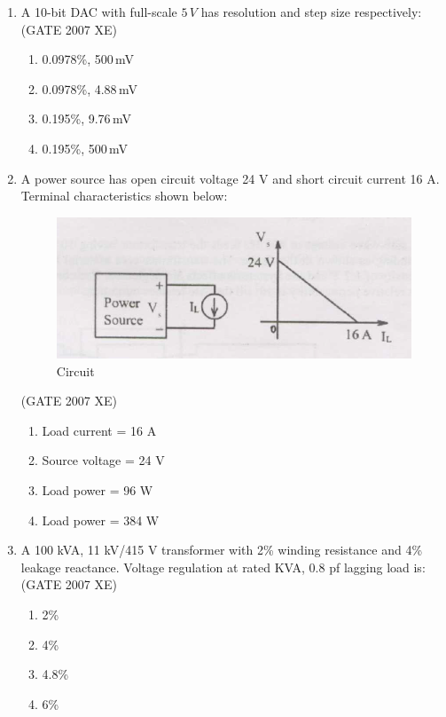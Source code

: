 \documentclass[journal,cmex10]{IEEEtran}
\theoremstyle{remark}
\numberwithin{equation}{enumi}
\numberwithin{figure}{enumi}
\begin{document}
\begin{enumerate}
    \item A 10-bit DAC with full-scale $5\,V$ has resolution and step size respectively:\\
    \hfill{(GATE 2007 XE)}
    \begin{multicols}{2}
    \begin{enumerate}
        \item 0.0978\%, 500\,mV
        \item 0.0978\%, 4.88\,mV
        \item 0.195\%, 9.76\,mV
        \item 0.195\%, 500\,mV
    \end{enumerate}
\end{multicols}

\newpage
    \item A power source has open circuit voltage 24 V and short circuit current 16 A. Terminal characteristics shown below:
    \begin{figure}[htbp]
  \centering
  \includegraphics[width=0.6\columnwidth]{figs/C/fig3.png}
  \caption{Circuit}
  \label{fig:C/fig3.png}
\end{figure}
    \hfill{(GATE 2007 XE)}
    \begin{multicols}{2}
    \begin{enumerate}
        \item Load current = 16 A
        \item Source voltage = 24 V
        \item Load power = 96 W
        \item Load power = 384 W
    \end{enumerate}
\end{multicols}

    \item A 100 kVA, 11 kV/415 V transformer with 2\% winding resistance and 4\% leakage reactance. Voltage regulation at rated KVA, 0.8 pf lagging load is:
    \hfill{(GATE 2007 XE)}
    \begin{multicols}{4}
    \begin{enumerate}
        \item 2\%
        \item 4\%
        \item 4.8\%
        \item 6\%
    \end{enumerate}
\end{multicols}


\end{enumerate}
\end{document}
